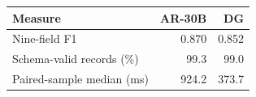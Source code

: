 \begin{tabular}{@{}lrr@{}}
\toprule
Measure & AR-30B & DG \\
\midrule
Nine-field F1 & 0.870 & 0.852 \\
Schema-valid records (\%) & 99.3 & 99.0 \\
Paired-sample median (ms) & 924.2 & 373.7 \\
\bottomrule
\end{tabular}
